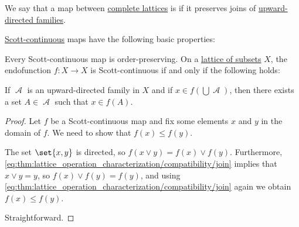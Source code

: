\begin{definition}\label{def:scott_continuity}
  We say that a map between \hyperref[def:complete_lattice]{complete lattices} is  if it preserves joins of \hyperref[def:directed_set]{upward-directed families}.
\end{definition}

\begin{proposition}\label{thm:def:scott_continuous}
  \hyperref[def:scott_continuity]{Scott-continuous} maps have the following basic properties:
  \begin{thmenum}
     Every Scott-continuous map is order-preserving.
     On a \hyperref[thm:boolean_algebra_of_subsets]{lattice of subsets} \( X \), the endofunction \( f: X \to X \) is Scott-continuous if and only if the following holds:
    \begin{displayquote}
      If \( \mscrA \) is an upward-directed family in \( X \) and if \( x \in f(\bigcup \mscrA) \), then there exists a set \( A \in \mscrA \) such that \( x \in f(A) \).
    \end{displayquote}
  \end{thmenum}
\end{proposition}
\begin{proof}
   Let \( f \) be a Scott-continuous map and fix some elements \( x \) and \( y \) in the domain of \( f \). We need to show that \( f(x) \leq f(y) \).

  The set \( \set{ x, y } \) is directed, so \( f(x \vee y) = f(x) \vee f(y) \). Furthermore, \eqref{eq:thm:lattice_operation_characterization/compatibility/join} implies that \( x \vee y = y \), so \( f(x) \vee f(y) = f(y) \), and using \eqref{eq:thm:lattice_operation_characterization/compatibility/join} again we obtain \( f(x) \leq f(y) \).

   Straightforward.
\end{proof}

